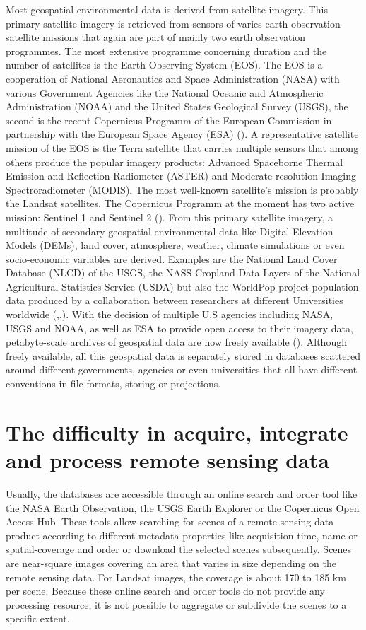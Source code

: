 Most geospatial environmental data is derived from satellite imagery. This primary satellite imagery is retrieved from sensors of varies earth observation satellite missions that again are part of mainly two earth observation programmes. The most extensive programme concerning duration and the number of satellites is the Earth Observing System (EOS). The EOS is a cooperation of National Aeronautics and Space Administration (NASA) with various Government Agencies like the National Oceanic and Atmospheric Administration (NOAA) and the United States Geological Survey (USGS), the second is the recent Copernicus Programm of the European Commission in partnership with the European Space Agency (ESA) (\cite{salomonson2002overview}). A representative satellite mission of the EOS is the Terra satellite that carries multiple sensors that among others produce the popular imagery products: Advanced Spaceborne Thermal Emission and Reflection Radiometer (ASTER) and Moderate-resolution Imaging Spectroradiometer (MODIS). The most well-known satellite's mission is probably the Landsat satellites. The Copernicus Programm at the moment has two active mission: Sentinel 1 and Sentinel 2 (\cite{butler2014earth}).
From this primary satellite imagery, a multitude of secondary geospatial environmental data like Digital Elevation Models (DEMs), land cover, atmosphere, weather, climate simulations or even socio-economic variables are derived. Examples are the National Land Cover Database (NLCD) of the USGS, the NASS Cropland Data Layers of the National Agricultural Statistics Service (USDA) but also the WorldPop project population data produced by a collaboration between researchers at different Universities worldwide (\cite{homer2007completion},\cite{johnson20102009},\cite{tatem2017worldpop}). 
With the decision of multiple U.S agencies including NASA, USGS and NOAA, as well as ESA to provide open access to their imagery data, petabyte-scale archives of geospatial data are now freely available (\cite{gorelick2017google}).
Although freely available, all this geospatial data is separately stored in databases scattered around different governments, agencies or even universities that all have different conventions in file formats, storing or projections. 

\section{The difficulty in acquire, integrate and process remote sensing data}

Usually, the databases are accessible through an online search and order tool like the NASA Earth Observation, the USGS Earth Explorer or the Copernicus Open Access Hub. These tools allow searching for scenes of a remote sensing data product according to different metadata properties like acquisition time, name or spatial-coverage and order or download the selected scenes subsequently. 
Scenes are near-square images covering an area that varies in size depending on the remote sensing data. For Landsat images, the coverage is about 170 to 185 km per scene. Because these online search and order tools do not provide any processing resource, it is not possible to aggregate or subdivide the scenes to a specific extent.

